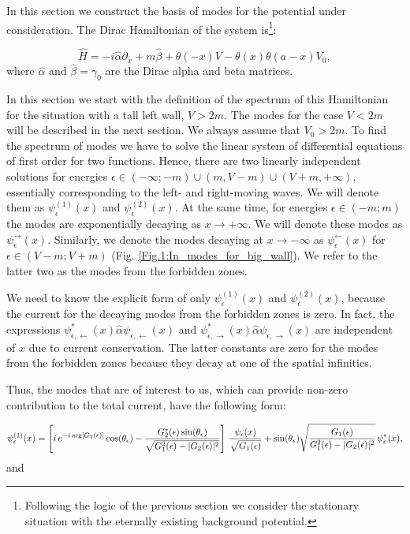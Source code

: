 \documentclass[12pt]{article}
\begin{document}
In this section we construct the basis of modes for the potential under consideration.
The Dirac Hamiltonian of the system is\footnote{Following the logic of the previous section we consider the stationary situation with the eternally existing background potential.}:

\begin{equation}
    \hat{H} = -i\hat{\alpha}\partial_{x}+m\hat{\beta}+\theta(-x)V-\theta(x)\theta(a-x)V_0,
\end{equation}
where $\hat{\alpha}$ and $\hat{\beta} = \gamma_0$ are the Dirac alpha and beta matrices. 

In this section we start with the definition of the spectrum of this Hamiltonian for the situation with a tall left wall, $V>2m$. The modes for the case $V<2m$ will be described in the next section. We always assume that $V_0 > 2m$. To find the spectrum of modes we have to solve the linear system of differential equations of first order for two functions. Hence, there are two linearly independent solutions for energies $\epsilon\in(-\infty;-m)\cup(m,V-m)\cup(V+m,+\infty)$, essentially corresponding to the left- and right-moving waves. We will denote them as $\psi^{(1)}_{\epsilon}(x)$ and $\psi^{(2)}_{\epsilon}(x)$. At the same time, for energies $\epsilon\in(-m;m)$ the modes are exponentially decaying as $x\rightarrow+\infty$. We will denote these modes as $\psi^{\rightarrow}_{\epsilon}(x)$. Similarly, we denote the modes decaying at $x \to - \infty$ as $\psi^{\leftarrow}_{\epsilon}(x)$ for $\epsilon\in(V-m;V+m)$ (Fig. \ref{Fig.1:In_modes_for_big_wall}). We refer to the latter two as the modes from the forbidden zones.
	
We need to know the explicit form of only $\psi^{(1)}_{\epsilon}(x)$ and $\psi^{(2)}_{\epsilon}(x)$, because the current for the decaying modes from the forbidden zones is zero. In fact, the expressions $\psi^*_{\epsilon,\leftarrow}(x)\hat{\alpha}\psi_{\epsilon,\leftarrow}(x)$ and $\psi^*_{\epsilon,\rightarrow}(x)\hat{\alpha}\psi_{\epsilon,\rightarrow}(x)$ are independent of $x$ due to current conservation. The latter constants are zero for the modes from the forbidden zones because they decay at one of the spatial infinities.

Thus, the modes that are of interest to us, which can provide non-zero contribution to the total current, have the following form:

\begin{equation}
	\psi^{(1)}_{\epsilon}(x) = \left[i \, e^{- i \,  {\rm arg}[G_2(\epsilon)]}\cos(\theta_{\epsilon})-\frac{G^*_2(\epsilon)\sin(\theta_{\epsilon})}{\sqrt{G_1^2(\epsilon)-|G_2(\epsilon)|^2}}\right] \, \frac{\psi_{\epsilon}(x)}{\sqrt{G_1(\epsilon)}} + \sin(\theta_{\epsilon})\sqrt{\frac{G_1(\epsilon)}{G_1^2(\epsilon)-|G_2(\epsilon)|^2}} \, \psi^*_{\epsilon}(x),
\end{equation}
and
\end{document}
